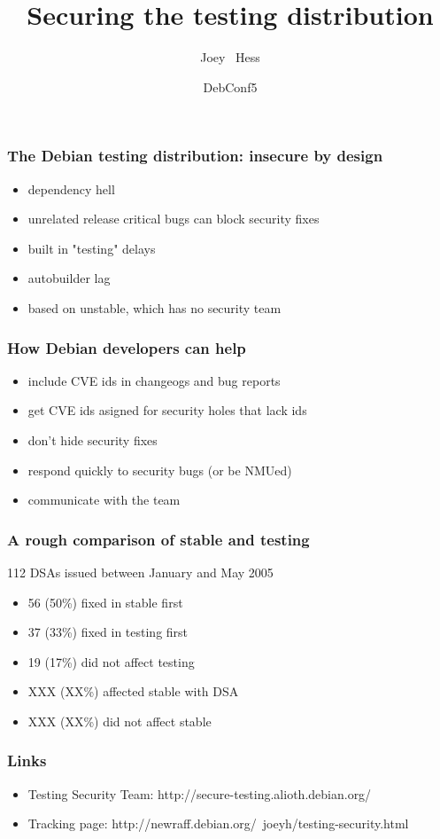 \documentclass{beamer}
\title[] %
{Securing the testing distribution}
\author[] %
{Joey ~Hess}
\date[] %
{DebConf5}
\begin{document}
\begin{frame}
  \titlepage
\end{frame}

\begin{frame}
  \frametitle{The Debian testing distribution: insecure by design}
	\begin{itemize}
	\item
		dependency hell
	\item
		unrelated release critical bugs can block security fixes
	\item
		built in "testing" delays
	\item
		autobuilder lag
	\item
		based on unstable, which has no security team
	\end{itemize}
\end{frame}

\begin{frame}
  \frametitle{How Debian developers can help}
	\begin{itemize}
	\item
		include CVE ids in changeogs and bug reports
	\item
		get CVE ids asigned for security holes that lack ids
	\item
		don't hide security fixes
	\item
		respond quickly to security bugs (or be NMUed)
	\item
		communicate with the team
	\end{itemize}
\end{frame}

\begin{frame}
  \frametitle{A rough comparison of stable and testing}
	112 DSAs issued between January and May 2005
	\begin{itemize}
	\item
		56 (50\%) fixed in stable first
	\item
		37 (33\%) fixed in testing first
	\item
		19 (17\%) did not affect testing
	\item
		XXX (XX\%) affected stable with DSA
	\item
		XXX (XX\%) did not affect stable
	\end{itemize}
\end{frame}

\begin{frame}
  \frametitle{Links}
  	\begin{itemize}
		\item
			Testing Security Team: http://secure-testing.alioth.debian.org/
		\item
			Tracking page: http://newraff.debian.org/~joeyh/testing-security.html
	\end{itemize}
\end{frame}
\end{document}
